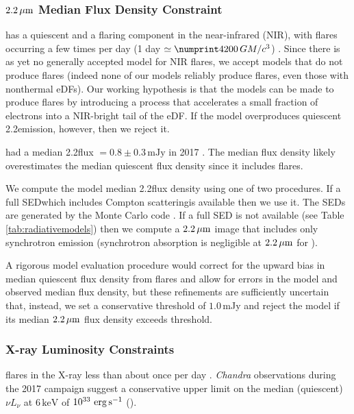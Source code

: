 \subsubsection{\texorpdfstring{$2.2\,\mu\mathrm{m}$}{2um} Median Flux Density Constraint}\label{subsec:nir}

\sgra has a quiescent and a flaring component in the near-infrared (NIR), with flares occurring a few times per day
(1 day $\simeq \no{4200}\,\tg$) \citep{2018ApJ...863...15W}.
Since there is as yet no generally accepted model for NIR flares, we accept models that do not produce flares (indeed none of our models reliably produce flares, even those with nonthermal eDFs).
Our working hypothesis is that the models can be made to produce flares by introducing a process that accelerates a small fraction of electrons into a  NIR-bright tail of the eDF.  If the model overproduces quiescent 2.2\um emission, however, then we reject it.

\sgra had a median 2.2\um flux $= 0.8 \pm 0.3\,\mathrm{mJy}$ in 2017  \citep[][see Table 1]{2020A&A...638A...2G}.
The median flux density likely overestimates the median quiescent flux density since it includes flares.

We compute the model median 2.2\um flux density using one of two procedures.
If a full SED\textemdash which includes Compton scattering\textemdash is available then we use it.
The SEDs are generated by the \grmonty Monte Carlo code \citep{2009ApJS..184..387D, Wong_2022}.
If a full SED is not available (see Table \ref{tab:radiativemodels}) then we compute a $2.2\,\mu\mathrm{m}$ image that includes only synchrotron emission (synchrotron absorption is negligible at $2.2\,\mu\mathrm{m}$ for \sgra).

A rigorous model evaluation procedure would correct for the upward bias in median quiescent flux density from flares and allow for errors in the model and observed median flux density, but these refinements are sufficiently uncertain that, instead, we set a conservative threshold of $1.0$\,mJy and reject the model if its
median $2.2\,\mu\mathrm{m}$ flux density exceeds threshold.

\subsubsection{X-ray Luminosity Constraints}

\sgra flares in the X-ray less than about once per day \citep[see][and references therein]{2018MNRAS.473..306Y}.
\emph{Chandra} observations during the 2017 campaign suggest a conservative upper limit on the median (quiescent) $\nu L_\nu$ at $6\,\mathrm{keV}$ of $10^{33}\,\,\mathrm{erg}\,\mathrm{s}^{-1}$ ().

